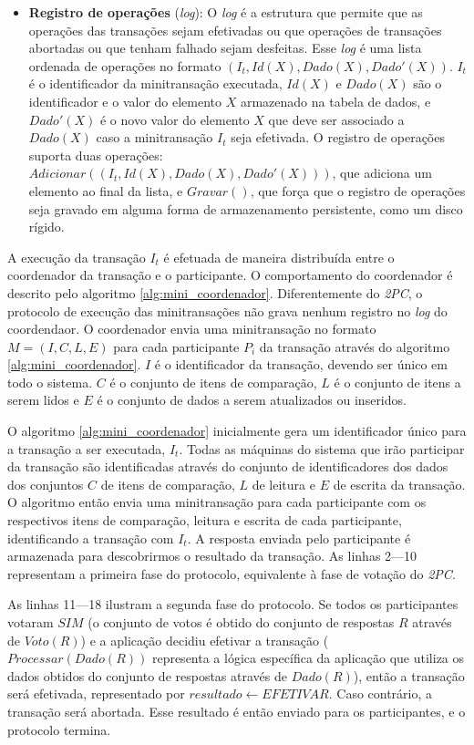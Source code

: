 \documentclass[11pt,twoside,a4paper]{book}
\begin{document}
\begin{itemize}
\item \textbf{Registro de operações} (\emph{log}): O \emph{log} é a estrutura que permite que as operações das transações sejam efetivadas ou que operações de transações abortadas ou que tenham falhado sejam desfeitas. Esse \emph{log} é uma lista ordenada de operações no formato $(I_t, Id(X), Dado(X), Dado'(X))$. $I_t$ é o identificador da minitransação executada, $Id(X)$ e $Dado(X)$ são o identificador e o valor do elemento $X$ armazenado na tabela de dados, e $Dado'(X)$ é o novo valor do elemento $X$ que deve ser associado a $Dado(X)$ caso a minitransação $I_t$ seja efetivada. O registro de operações suporta duas operações: $Adicionar((I_t, Id(X), Dado(X), Dado'(X)))$, que adiciona um elemento ao final da lista, e $Gravar()$, que força que o registro de operações seja gravado em alguma forma de armazenamento persistente, como um disco rígido.

\end{itemize}

A execução da transação \(I_t\) é efetuada de maneira distribuída entre o coordenador da transação e o participante. O comportamento do coordenador é descrito pelo algoritmo \ref{alg:mini_coordenador}. Diferentemente do \emph{2PC}, o protocolo de execução das minitransações não grava nenhum registro no \emph{log} do coordendaor. O coordenador envia uma minitransação no formato \(M = (I, C, L, E)\) para cada participante \(P_i\) da transação através do algoritmo \ref{alg:mini_coordenador}. $I$ é o identificador da transação, devendo ser único em todo o sistema. $C$ é o conjunto de itens de comparação, $L$ é o conjunto de itens a serem lidos e $E$ é o conjunto de dados a serem atualizados ou inseridos.

O algoritmo \ref{alg:mini_coordenador} inicialmente gera um identificador único para a transação a ser executada, $I_t$. Todas as máquinas do sistema que irão participar da transação são identificadas através do conjunto de identificadores dos dados dos conjuntos $C$ de itens de comparação, $L$ de leitura e $E$ de escrita da transação. O algoritmo então envia uma minitransação para cada participante com os respectivos itens de comparação, leitura e escrita de cada participante, identificando a transação com $I_t$. A resposta enviada pelo participante é armazenada para descobrirmos o resultado da transação. As linhas 2---10 representam a primeira fase do protocolo, equivalente à fase de votação do \emph{2PC}.

As linhas 11---18 ilustram a segunda fase do protocolo. Se todos os participantes votaram $SIM$ (o conjunto de votos é obtido do conjunto de respostas $R$ através de $Voto(R)$) e a aplicação decidiu efetivar a transação ($Processar(Dado(R))$ representa a lógica específica da aplicação que utiliza os dados obtidos do conjunto de respostas através de $Dado(R)$), então a transação será efetivada, representado por $resultado \gets EFETIVAR$. Caso contrário, a transação será abortada. Esse resultado é então enviado para os participantes, e o protocolo termina.
\end{document}
